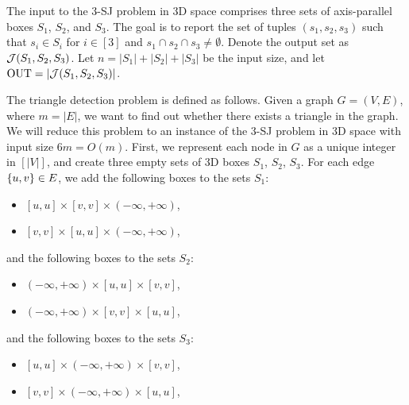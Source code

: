 The input to the 3-SJ problem in 3D space comprises
 three sets of axis-parallel boxes $S_1$, $S_2$, and $S_3$. 
The goal is to report the set of tuples $(s_1,s_2,s_3)$ such that $s_i \in S_i$ for $i \in [3]$ and $s_1 \cap s_2 \cap s_3 \neq \emptyset$. Denote the output set as $\mathcal{J}(S_1,S_2,S_3)$.
Let $n=|S_1|+|S_2|+|S_3|$ be the input size, and let $\mathrm{OUT} = |\mathcal{J}(S_1,S_2,S_3)|$.

The triangle detection problem is defined as follows. Given a graph $G = (V,E)$, where $m=|E|$, we want to find out whether there exists a triangle in the graph. We will reduce this problem to an instance of the 3-SJ problem in 3D space with input size $6m=O(m)$. First, we represent each node in $G$ as a unique integer in $[|V|]$, and create three empty sets of 3D boxes $S_1$, $S_2$, $S_3$. For each edge $\{u,v\}\in E$, we add the following boxes to the sets $S_1$:
\begin{itemize}
    \item $[u,u]\times [v,v]\times(-\infty,+\infty)$,
    \item $[v,v]\times [u,u] \times (-\infty,+\infty)$,
\end{itemize}
and the following boxes to the sets $S_2$:
\begin{itemize}
    \item $(-\infty,+\infty)\times[u,u]\times [v,v]$,
    \item $(-\infty,+\infty) \times[v,v]\times [u,u]$,
\end{itemize}
and the following boxes to the sets $S_3$:
\begin{itemize}
    \item $[u,u]\times(-\infty,+\infty)\times [v,v]$,
    \item $[v,v]\times(-\infty,+\infty)\times [u,u]$,
\end{itemize}


